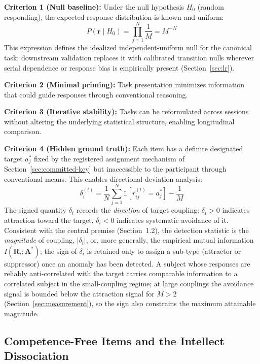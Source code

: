 \documentclass[11pt,letterpaper]{article}
\begin{document}
\medskip
\noindent\textbf{Criterion 1 (Null baseline):} Under the null hypothesis $H_0$ (random responding), the expected response distribution is known and uniform:
\begin{equation}
P(\mathbf{r} \mid H_0) = \prod_{j=1}^{N} \frac{1}{M} = M^{-N}
\end{equation}
This expression defines the idealized independent-uniform null for the canonical task; downstream validation replaces it with calibrated transition nulls wherever serial dependence or response bias is empirically present (Section~\ref{sec:lr}).

\noindent\textbf{Criterion 2 (Minimal priming):} Task presentation minimizes information that could guide responses through conventional reasoning.

\noindent\textbf{Criterion 3 (Iterative stability):} Tasks can be reformulated across sessions without altering the underlying statistical structure, enabling longitudinal comparison.

\noindent\textbf{Criterion 4 (Hidden ground truth):} Each item has a definite designated target $a_j^*$ fixed by the registered assignment mechanism of Section~\ref{sec:committed-key} but inaccessible to the participant through conventional means. This enables directional deviation analysis:
\begin{equation}
\delta_i^{(t)} = \frac{1}{N} \sum_{j=1}^{N} \mathbb{1}[r_{ij}^{(t)} = a_j^*] - \frac{1}{M}
\label{eq:directional}
\end{equation}
The signed quantity $\delta_i$ records the \textit{direction} of target coupling: $\delta_i > 0$ indicates attraction toward the target, $\delta_i < 0$ indicates systematic avoidance of it. Consistent with the central premise (Section~1.2), the detection statistic is the \textit{magnitude} of coupling, $|\delta_i|$, or, more generally, the empirical mutual information $I(\mathbf{R}_i; \mathbf{A}^*)$; the sign of $\delta_i$ is retained only to assign a sub-type (attractor or suppressor) once an anomaly has been detected. A subject whose responses are reliably anti-correlated with the target carries comparable information to a correlated subject in the small-coupling regime; at large couplings the avoidance signal is bounded below the attraction signal for $M > 2$ (Section~\ref{sec:measurement}), so the sign also constrains the maximum attainable magnitude.

\subsection{Competence-Free Items and the Intellect Dissociation}
\label{sec:nonsense}
\end{document}
